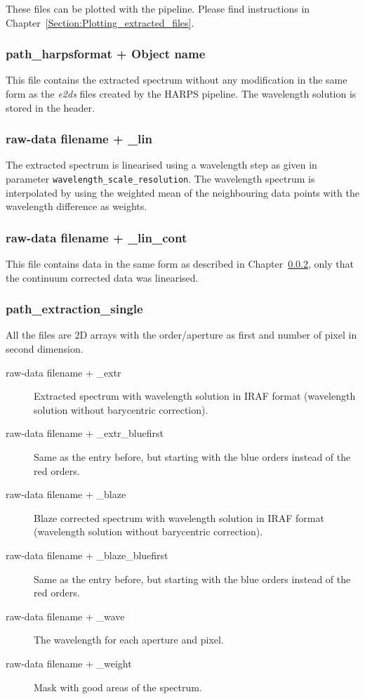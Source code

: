 \documentclass[10pt,a4paper]{article}
\begin{document}
These files can be plotted with the pipeline. Please find instructions in Chapter~\ref{Section:Plotting_extracted_files}.

\subsubsection{path\_harpsformat + Object name}
This file contains the extracted spectrum without any modification in the same form as the \textit{e2ds} files created by the HARPS pipeline. The wavelength solution is stored in the header.

\subsubsection{raw-data filename + \_lin}
\label{Section:linearised_spectrum}
The extracted spectrum is linearised using a wavelength step as given in parameter \verb|wavelength_scale_resolution|. The wavelength spectrum is interpolated by using the weighted mean of the neighbouring data points with the wavelength difference as weights.

\subsubsection{raw-data filename + \_lin\_cont}
This file contains data in the same form as described in Chapter~\ref{Section:linearised_spectrum}, only that the continuum corrected data was linearised.

\subsubsection{path\_extraction\_single}
All the files are 2D arrays with the order/aperture as first and number of pixel in second dimension.
\begin{description}
 \item[raw-data filename + \_extr] Extracted spectrum with wavelength solution in IRAF format (wavelength solution without barycentric correction).
 \item[raw-data filename + \_extr\_bluefirst] Same as the entry before, but starting with the blue orders instead of the red orders.
 \item[raw-data filename + \_blaze] Blaze corrected spectrum with wavelength solution in IRAF format (wavelength solution without barycentric correction).
 \item[raw-data filename + \_blaze\_bluefirst] Same as the entry before, but starting with the blue orders instead of the red orders.
 \item[raw-data filename + \_wave] The wavelength for each aperture and pixel.
 \item[raw-data filename + \_weight] Mask with good areas of the spectrum.
\end{description}
\end{document}
